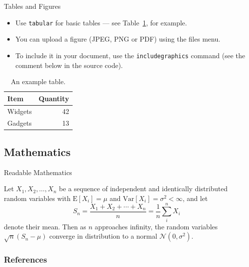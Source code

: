\documentclass[10pt]{beamer}
\begin{document}
\begin{frame}{Tables and Figures}

\begin{itemize}
\item Use \texttt{tabular} for basic tables --- see Table~\ref{tab:widgets}, for example.
\item You can upload a figure (JPEG, PNG or PDF) using the files menu. 
\item To include it in your document, use the \texttt{includegraphics} command (see the comment below in the source code).
\end{itemize}


\begin{table}
\centering
\begin{tabular}{l|r}
Item & Quantity \\\hline
Widgets & 42 \\
Gadgets & 13
\end{tabular}
\caption{\label{tab:widgets}An example table.}
\end{table}

\end{frame}

\subsection{Mathematics}

\begin{frame}{Readable Mathematics}

Let $X_1, X_2, \ldots, X_n$ be a sequence of independent and identically distributed random variables with $\text{E}[X_i] = \mu$ and $\text{Var}[X_i] = \sigma^2 < \infty$, and let
\[ S_n = \frac{X_1 + X_2 + \cdots + X_n}{n}
      = \frac{1}{n}\sum_{i}^{n} X_i \]
denote their mean. Then as $n$ approaches infinity, the random variables $\sqrt{n}(S_n - \mu)$ converge in distribution to a normal $\mathcal{N}(0, \sigma^2)$.

\end{frame}

\begin{frame}[t,allowframebreaks]
\frametitle{References}


\end{frame}
\end{document}
